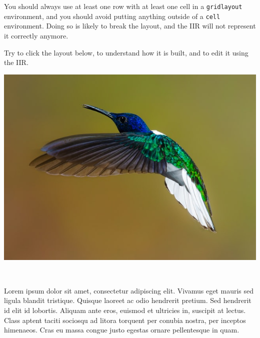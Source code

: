 \documentclass[11pt, a4paper]{article}
\begin{document}
\begin{warning}
    You should always use at least one row with at least one cell in a \texttt{gridlayout} environment, and you should avoid putting anything outside of a \texttt{cell} environment.
    Doing so is likely to break the layout, and the IIR will not represent it correctly anymore.
\end{warning}

\begin{example}
    Try to click the layout below, to understand how it is built, and to edit it using the IIR.

    \begin{gridlayout}{\textwidth}{11cm}
        \begin{row}{0.65}
            \begin{cell}{0.65}
                \includegraphics[width=\cellwidth]{img/bird.jpg}
            \end{cell}
            \begin{cell}{0.05}
                ~
            \end{cell}
            \begin{cell}{0.3}
                Lorem ipsum dolor sit amet, consectetur adipiscing elit. Vivamus eget mauris sed ligula blandit tristique. Quisque laoreet ac odio hendrerit pretium. Sed hendrerit id elit id lobortis. Aliquam ante eros, euismod et ultricies in, suscipit at lectus. Class aptent taciti sociosqu ad litora torquent per conubia nostra, per inceptos himenaeos. Cras eu massa congue justo egestas ornare pellentesque in quam.
            \end{cell}
        \end{row}

\end{gridlayout}
\end{example}
\end{document}
